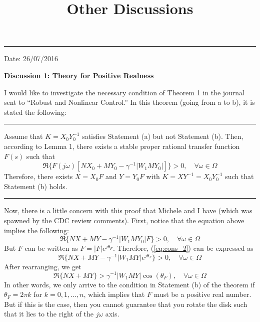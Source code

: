 \documentclass[12pt]{article}
\title{\LARGE \bf Other Discussions}
\begin{document}
\maketitle

\hrule
\begin{flushright}
Date: 26/07/2016
\end{flushright}
\textbf{Discussion 1: Theory for Positive Realness}

I would like to investigate the necessary condition of Theorem 1 in the journal sent to ``Robust and Nonlinear Control.'' In this theorem (going from a to b), it is stated the following:
\vspace{0.2cm} \hrule 

Assume that $K = X_0Y_0^{-1}$ satisfies Statement (a) but not Statement (b). Then, according to Lemma 1, there exists a stable proper rational transfer function $F(s)$ such that
\begin{equation}
\Re \{ F(j\omega)[NX_0+MY_0-\gamma^{-1}|W_1MY_0|]\} > 0, \quad \forall \omega \in \Omega
\end{equation}
Therefore, there exists $X = X_0F$ and $Y = Y_0F$ with $K = XY^{-1} = X_0Y_0^{-1}$ such that Statement (b) holds. 
\hrule \vspace{0.2cm}

Now, there is a little concern with this proof that Michele and I have (which was spawned by the CDC review comments). First, notice that the equation above implies the following:
\begin{equation} \label{eq:cons_2}
\Re \{ NX+MY-\gamma^{-1}|W_1MY_0|F\} > 0, \quad \forall \omega \in \Omega
\end{equation}
But $F$ can be written as $F = |F|e^{j\theta_F}$. Therefore, (\ref{eq:cons_2}) can be expressed as 
\begin{equation} \label{eq:cons_3}
\Re \{ NX+MY-\gamma^{-1}|W_1MY|e^{j\theta_F}\}  > 0, \quad \forall \omega \in \Omega
\end{equation}
After rearranging, we get
\begin{equation} \label{eq:cons_4}
\Re \{ NX+MY\}>\gamma^{-1}|W_1MY|\cos (\theta_F) , \quad \forall \omega \in \Omega
\end{equation}
In other words, we only arrive to the condition in Statement (b) of the theorem if $\theta_F = 2\pi k$ for $k = 0,1,\ldots,n$, which implies that $F$ must be a positive real number. But if this is the case, then you cannot guarantee that you rotate the disk such that it lies to the right of the $j\omega$ axis. 
\end{document}
